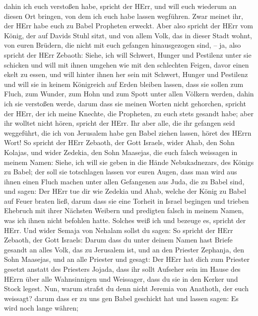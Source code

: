 dahin ich euch verstoßen habe, spricht der HErr, und will euch wiederum
an diesen Ort bringen, von dem ich euch habe lassen wegführen.
 Zwar meinet ihr, der HErr habe euch zu Babel Propheten
erweckt.  Aber also spricht der HErr vom König, der auf
Davids Stuhl sitzt, und von allem Volk, das in dieser Stadt wohnt, von
euren Brüdern, die nicht mit euch gefangen hinausgezogen sind,
 -- ja, also spricht der HErr Zebaoth: Siehe, ich will
Schwert, Hunger und Pestilenz unter sie schicken und will mit ihnen
umgehen wie mit den schlechten Feigen, davor einen ekelt zu essen,
 und will hinter ihnen her sein mit Schwert, Hunger und
Pestilenz und will sie in keinem Königreich auf Erden bleiben lassen,
dass sie sollen zum Fluch, zum Wunder, zum Hohn und zum Spott unter
allen Völkern werden, dahin ich sie verstoßen werde,  darum
dass sie meinen Worten nicht gehorchen, spricht der HErr, der ich meine
Knechte, die Propheten, zu euch stets gesandt habe; aber ihr wolltet
nicht hören, spricht der HErr.  Ihr aber alle, die ihr
gefangen seid weggeführt, die ich von Jerusalem habe gen Babel ziehen
lassen, höret des HErrn Wort!  So spricht der HErr Zebaoth,
der Gott Israels, wider Ahab, den Sohn Kolajas, und wider Zedekia, den
Sohn Maasejas, die euch falsch weissagen in meinem Namen: Siehe, ich
will sie geben in die Hände Nebukadnezars, des Königs zu Babel; der soll
sie totschlagen lassen vor euren Augen,  dass man wird aus
ihnen einen Fluch machen unter allen Gefangenen aus Juda, die zu Babel
sind, und sagen: Der HErr tue dir wie Zedekia und Ahab, welche der König
zu Babel auf Feuer braten ließ,  darum dass sie eine
Torheit in Israel begingen und trieben Ehebruch mit ihrer Nächsten
Weibern und predigten falsch in meinem Namen, was ich ihnen nicht
befohlen hatte. Solches weiß ich und bezeuge es, spricht der HErr.
 Und wider Semaja von Nehalam sollst du sagen:
 So spricht der HErr Zebaoth, der Gott Israels: Darum dass
du unter deinem Namen hast Briefe gesandt an alles Volk, das zu
Jerusalem ist, und an den Priester Zephanja, den Sohn Maasejas, und an
alle Priester und gesagt:  Der HErr hat dich zum Priester
gesetzt anstatt des Priesters Jojada, dass ihr sollt Aufseher sein im
Hause des HErrn über alle Wahnsinnigen und Weissager, dass du sie in den
Kerker und Stock legest.  Nun, warum strafst du denn nicht
Jeremia von Anathoth, der euch weissagt?  darum dass er zu
uns gen Babel geschickt hat und lassen sagen: Es wird noch lange währen;
